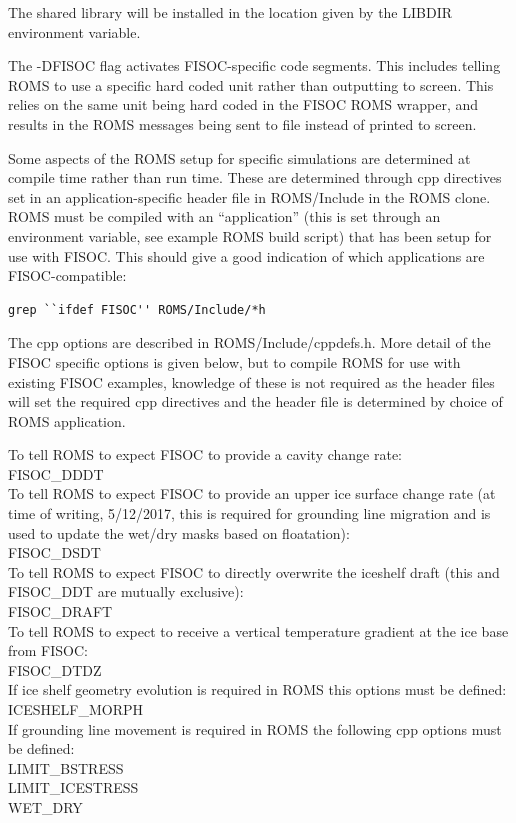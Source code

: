\documentclass[12pt]{article}
\begin{document}
The shared library will be installed in the location given by the 
 LIBDIR environment variable. 

The -DFISOC flag activates FISOC-specific code segments.  
This includes telling ROMS to use a 
specific hard coded unit rather than outputting to screen.  This relies on the 
same unit being hard coded in the FISOC ROMS wrapper, and results in the ROMS 
messages being sent to file instead of printed to screen.

Some aspects of the ROMS setup for specific simulations are determined at 
compile time rather than run time. 
These are determined through cpp directives set in an application-specific 
header file in ROMS/Include in the ROMS clone. 
ROMS must be compiled with an ``application'' (this is set through an 
environment variable, see example ROMS build script) that has been setup for 
use with FISOC. 
This should give a good indication of which applications are FISOC-compatible:
\begin{lstlisting}
grep ``ifdef FISOC'' ROMS/Include/*h
\end{lstlisting}

The cpp options are described in ROMS/Include/cppdefs.h. 
More detail of the FISOC specific options is given below, but to compile ROMS 
for use with 
existing FISOC examples, knowledge of these is not required as the header 
files will set the required cpp directives and the header file is determined by 
choice of ROMS application.

\begin{flushleft}
To tell ROMS to expect FISOC to provide a cavity change rate:\\
FISOC\_DDDT\\
To tell ROMS to expect FISOC to provide an upper ice surface change rate
(at time of writing, 5/12/2017, this is required for grounding line migration 
and is used to update the wet/dry masks based on floatation):\\
FISOC\_DSDT\\
To tell ROMS to expect FISOC to directly overwrite the iceshelf draft 
(this and FISOC\_DDT are mutually exclusive):\\
FISOC\_DRAFT\\
To tell ROMS to expect to receive a vertical temperature gradient 
at the ice base from FISOC: \\
FISOC\_DTDZ\\
If ice shelf geometry evolution is required in ROMS this options must be 
defined:\\
ICESHELF\_MORPH\\
If grounding line movement is required in ROMS the following cpp options 
must be defined:\\
LIMIT\_BSTRESS\\
LIMIT\_ICESTRESS\\
WET\_DRY
\end{flushleft}
\end{document}
